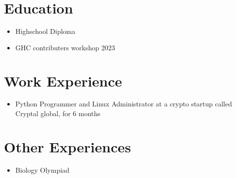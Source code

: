 \documentclass{article}
\begin{document}
\section{Education}

\begin{itemize}
\item Highschool Diploma
\item GHC contributers workshop 2023
\end{itemize}

\section{Work Experience}
\begin{itemize}
\item Python Programmer and Linux Administrator at a crypto startup
called Cryptal global, for 6 months
\end{itemize}

\section{Other Experiences}
\begin{itemize}
\item Biology Olympiad
\end{itemize}
\end{document}
